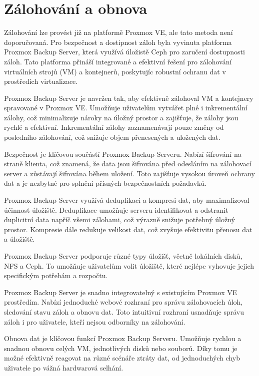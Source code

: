 \chapter{Zálohování a obnova}

Zálohování lze provést již na platformě Proxmox VE, ale tato metoda není doporučovaná. Pro bezpečnost a dostipnost záloh byla vyvinuta platforma Proxmox Backup Server, která využívá úložistě Ceph pro zaručení dostupnosti záloh. Tato platforma přináší integrované a efektivní řešení pro zálohování virtuálních strojů (VM) a kontejnerů, poskytujíc robustní ochranu dat v prostředích virtualizace.

Proxmox Backup Server je navržen tak, aby efektivně zálohoval VM a kontejnery spravované v Proxmox VE. Umožňuje uživatelům vytvářet plné i inkrementální zálohy, což minimalizuje nároky na úložný prostor a zajišťuje, že zálohy jsou rychlé a efektivní. Inkrementální zálohy zaznamenávají pouze změny od posledního zálohování, což snižuje objem přenesených a uložených dat.

Bezpečnost je klíčovou součástí Proxmox Backup Serveru. Nabízí šifrování na straně klienta, což znamená, že data jsou šifrována před odesláním na zálohovací server a zůstávají šifrována během uložení. Toto zajišťuje vysokou úroveň ochrany dat a je nezbytné pro splnění přísných bezpečnostních požadavků.

Proxmox Backup Server využívá deduplikaci a kompresi dat, aby maximalizoval účinnost úložiště. Deduplikace umožňuje serveru identifikovat a odstranit duplicitní data napříč všemi zálohami, což výrazně snižuje potřebný úložný prostor. Kompresie dále redukuje velikost dat, což zvyšuje efektivitu přenosu dat a úložiště.

Proxmox Backup Server podporuje různé typy úložišť, včetně lokálních disků, NFS a Ceph. To umožňuje uživatelům volit úložiště, které nejlépe vyhovuje jejich specifickým potřebám a rozpočtu.

Proxmox Backup Server je snadno integrovatelný s existujícím Proxmox VE prostředím. Nabízí jednoduché webové rozhraní pro správu zálohovacích úloh, sledování stavu záloh a obnovu dat. Toto intuitivní rozhraní usnadňuje správu záloh i pro uživatele, kteří nejsou odborníky na zálohování.

Obnova dat je klíčovou funkcí Proxmox Backup Serveru. Umožňuje rychlou a snadnou obnovu celých VM, jednotlivých disků nebo souborů. Díky tomu je možné efektivně reagovat na různé scénáře ztráty dat, od jednoduchých chyb uživatele po vážná hardwarová selhání.